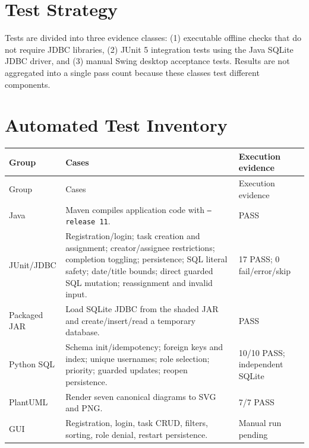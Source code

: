 \documentclass[11pt,a4paper]{article}
\begin{document}
\section{Test Strategy}
Tests are divided into three evidence classes: (1) executable offline checks that do not require JDBC libraries, (2) JUnit 5 integration tests using the Java SQLite JDBC driver, and (3) manual Swing desktop acceptance tests. Results are not aggregated into a single pass count because these classes test different components.

\section{Automated Test Inventory}
\small
\begin{longtable}{p{18mm}p{87mm}p{39mm}}
\toprule Group & Cases & Execution evidence \\ \midrule\endfirsthead
\toprule Group & Cases & Execution evidence \\ \midrule\endhead
Java & Maven compiles application code with \texttt{--release 11}. & PASS\\
JUnit/JDBC & Registration/login; task creation and assignment; creator/assignee restrictions; completion toggling; persistence; SQL literal safety; date/title bounds; direct guarded SQL mutation; reassignment and invalid input. & 17 PASS; 0 fail/error/skip\\
Packaged JAR & Load SQLite JDBC from the shaded JAR and create/insert/read a temporary database. & PASS\\
Python SQL & Schema init/idempotency; foreign keys and index; unique usernames; role selection; priority; guarded updates; reopen persistence. & 10/10 PASS; independent SQLite\\
PlantUML & Render seven canonical diagrams to SVG and PNG. & 7/7 PASS\\
GUI & Registration, login, task CRUD, filters, sorting, role denial, restart persistence. & Manual run pending\\
\bottomrule
\end{longtable}
\normalsize
\end{document}
